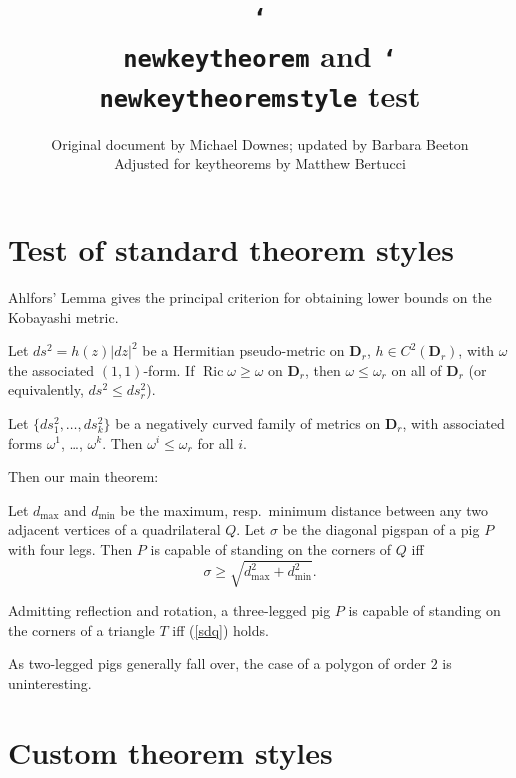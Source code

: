 \documentclass{article}
\title{\texttt{\char`\\ newkeytheorem} and \texttt{\char`\\ newkeytheoremstyle} test}
\author{%
  Original document by Michael Downes; updated by Barbara Beeton\\
  Adjusted for \textsf{keytheorems} by Matthew Bertucci
  }
\let\lvert=|\let\rvert=|
\newcommand{\Ric}{\mathop{\mathrm{Ric}}\nolimits}
\begin{document}
\maketitle

\section{Test of standard theorem styles}

Ahlfors' Lemma gives the principal criterion for obtaining lower bounds
on the Kobayashi metric.

\begin{Ahlfors}
Let $ds^2 = h(z)\lvert dz\rvert^2$ be a Hermitian pseudo-metric on
$\mathbf{D}_r$, $h\in C^2(\mathbf{D}_r)$, with $\omega$ the associated
$(1,1)$-form. If $\Ric\omega\geq\omega$ on $\mathbf{D}_r$,
then $\omega\leq\omega_r$ on all of $\mathbf{D}_r$ (or equivalently,
$ds^2\leq ds_r^2$).
\end{Ahlfors}

\begin{lem}
Let $\{ds_1^2,\dots,ds_k^2\}$ be a negatively curved family of metrics
on $\mathbf{D}_r$, with associated forms $\omega^1$, \dots, $\omega^k$.
Then $\omega^i \leq\omega_r$ for all $i$.
\end{lem}

Then our main theorem:
\begin{thm}\label{pigspan}
Let $d_{\max}$ and $d_{\min}$ be the maximum, resp.\ minimum distance
between any two adjacent vertices of a quadrilateral $Q$. Let $\sigma$
be the diagonal pigspan of a pig $P$ with four legs.
Then $P$ is capable of standing on the corners of $Q$ iff
\begin{equation}\label{sdq}
\sigma\geq \sqrt{d_{\max}^2+d_{\min}^2}.
\end{equation}
\end{thm}

\begin{cor}
Admitting reflection and rotation, a three-legged pig $P$ is capable of
standing on the corners of a triangle $T$ iff (\ref{sdq}) holds.
\end{cor}

\begin{rmk}
As two-legged pigs generally fall over, the case of a polygon of order
$2$ is uninteresting.
\end{rmk}

\section{Custom theorem styles}
\end{document}
